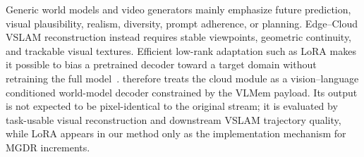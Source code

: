 Generic world models and video generators mainly emphasize future prediction, visual plausibility, realism, diversity, prompt adherence, or planning. Edge--Cloud VSLAM reconstruction instead requires stable viewpoints, geometric continuity, and trackable visual textures. Efficient low-rank adaptation such as LoRA makes it possible to bias a pretrained decoder toward a target domain without retraining the full model~\cite{hu2022lora}. \VLMemCodec{} therefore treats the cloud module as a vision--language conditioned world-model decoder constrained by the VLMem payload. Its output is not expected to be pixel-identical to the original stream; it is evaluated by task-usable visual reconstruction and downstream VSLAM trajectory quality, while LoRA appears in our method only as the implementation mechanism for MGDR increments.
